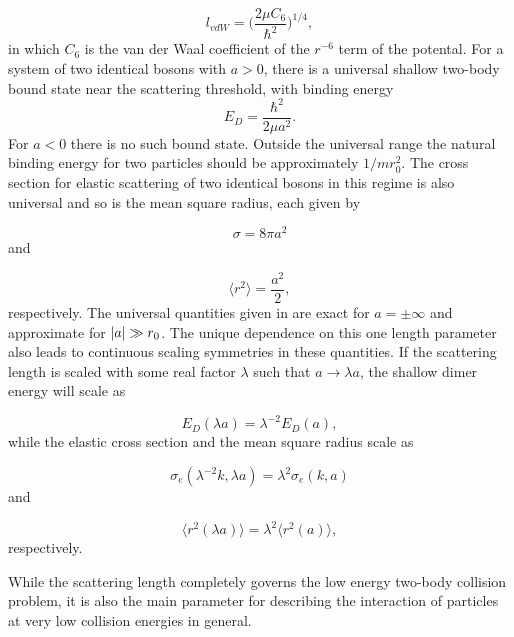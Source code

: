 \begin{equation}
l_{vdW} = \bigg(\frac{2\mu C_6}{\hbar^2}\bigg)^{1/4},
\end{equation}
in which $C_6$ is the van der Waal coefficient of the $r^{-6}$ term of the potental. For a system of two identical bosons with $a>0$, there is a universal shallow two-body bound state near the scattering threshold, with binding energy 
\begin{equation}\label{shallowdimer}
E_D = \frac{\hbar^2}{2 \mu a^2}.
\end{equation}
For $a<0$ there is no such bound state. Outside the universal range the natural binding energy for two particles should be approximately $1/mr_0^2$. The cross section for elastic scattering of two identical bosons in this regime is also universal and so is the mean square radius, each given by

\begin{equation}\label{elasticcross}
\sigma = 8\pi a^2
\end{equation}
and

\begin{equation}\label{meanradius}
\langle r^2\rangle = \frac{a^2}{2},
\end{equation}
respectively. The universal quantities given in  are exact for $a=\pm \infty$ and approximate for $\lvert a\rvert\gg r_0$. The unique dependence on this one length parameter also leads to continuous scaling symmetries in these quantities. If the scattering length is scaled with some real factor $\lambda$ such that $a \to \lambda a$, the shallow dimer energy will scale as 

\begin{equation}
E_D(\lambda a) = \lambda^{-2}E_D(a),
\end{equation}    
while the elastic cross section and the mean square radius scale as 

\begin{equation}
\sigma_e(\lambda^{-2}k,\lambda a) = \lambda^2 \sigma_e(k,a)
\end{equation}
and

\begin{equation}
\langle r^2(\lambda a)\rangle = \lambda^2 \langle r^2(a)\rangle ,
\end{equation}
respectively. 

While the scattering length completely governs the low energy two-body collision problem, it is also the main parameter for describing the interaction of particles at very low collision energies in general. 

